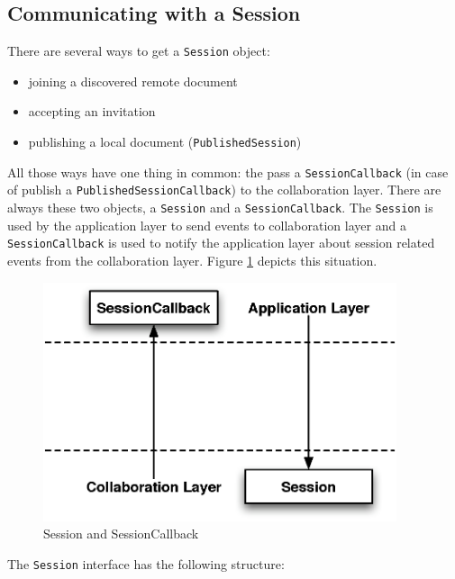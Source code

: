 \subsection{Communicating with a Session}
There are several ways to get a \texttt{Session} object:
\begin{itemize}
 \item joining a discovered remote document
 \item accepting an invitation
 \item publishing a local document (\texttt{PublishedSession})
\end{itemize}

All those ways have one thing in common: the pass a \texttt{SessionCallback}
(in case of publish a \texttt{PublishedSessionCallback}) to the collaboration
layer. There are always these two objects, a \texttt{Session} and
a \texttt{SessionCallback}. The \texttt{Session} is used by the application
layer to send events to collaboration layer and a \texttt{SessionCallback}
is used to notify the application layer about session related events from the 
collaboration layer. Figure \ref{fig:session and callback} depicts this 
situation.

\begin{figure}[H]
 \centering
 \includegraphics[width=10.37cm,height=7.02cm]{../images/design/collaboration-session.eps}
 \caption{Session and SessionCallback}
 \label{fig:session and callback}
\end{figure}

The \texttt{Session} interface has the following structure:

